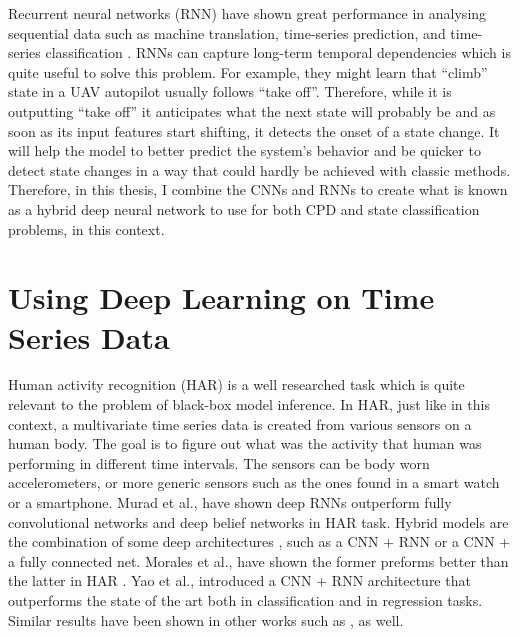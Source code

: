 Recurrent neural networks (RNN) have shown great performance in analysing sequential data such as machine translation, time-series prediction, and time-series classification \cite{cho2014learning, zhang2000predicting, wang2017time, murad2017deep, yang2015deep, Ordonez2016}. RNNs can capture long-term temporal dependencies which is quite useful to solve this problem. \cite{Che2018} For example, they might learn that ``climb'' state in a UAV autopilot usually follows ``take off''. Therefore, while it is outputting ``take off'' it anticipates what the next state will probably be and as soon as its input features start shifting, it detects the onset of a state change. It will help the model to better predict the system's behavior and be quicker to detect state changes in a way that could hardly be achieved with classic methods.
Therefore, in this thesis, I combine the CNNs and RNNs to create what is known as a hybrid deep neural network \cite{wang2017time} to use for both CPD and state classification problems, in this context.  

\section{Using Deep Learning on Time Series Data} \label{sec:related_work_har}
Human activity recognition (HAR) is a well researched task which is quite relevant to the problem of black-box model inference. In HAR, just like in this context, a multivariate time series data is created from various sensors on a human body. 
The goal is to figure out what was the activity that human was performing in different time intervals. The sensors can be body worn accelerometers, or more generic sensors such as the ones found in a smart watch or a smartphone. 
Murad et al., \cite{murad2017deep} have shown deep RNNs outperform fully convolutional networks and deep belief networks in HAR task.
Hybrid models are the combination of some deep architectures \cite{wang2019deep}, such as a CNN + RNN or a CNN + a fully connected net. Morales et al., have shown the former preforms better than the latter in HAR \cite{morales2016deep}. Yao et al., \cite{deepsense} introduced a CNN + RNN architecture that outperforms the state of the art both in classification and in regression tasks. Similar results have been shown in other works such as \cite{Ordonez2016, singh2017transforming, zheng2016exploiting}, as well.

